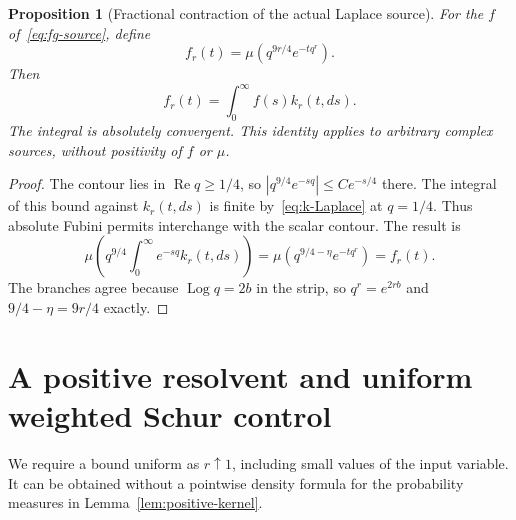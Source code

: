 \documentclass[11pt,a4paper]{article}
\numberwithin{equation}{section}
\newtheorem{proposition}[theorem]{Proposition}
\theoremstyle{definition}
\theoremstyle{remark}
\begin{document}
\begin{proposition}[Fractional contraction of the actual Laplace source]\label{prop:fractional-source}
For the $f$ of~\eqref{eq:fg-source}, define
\begin{equation}\label{eq:fr-definition}
 f_r(t)=\mu(q^{9r/4}e^{-tq^r}).
\end{equation}
Then
\begin{equation}\label{eq:fr-kernel}
 f_r(t)=\int_0^\infty f(s)k_r(t,ds).
\end{equation}
The integral is absolutely convergent. This identity applies to arbitrary complex sources, without positivity of $f$ or $\mu$.
\end{proposition}
\begin{proof}
The contour lies in $\operatorname{Re}q\ge1/4$, so
$|q^{9/4}e^{-sq}|\le C e^{-s/4}$ there. The integral of this bound against $k_r(t,ds)$ is finite by~\eqref{eq:k-Laplace} at $q=1/4$. Thus absolute Fubini permits interchange with the scalar contour. The result is
\[
 \mu\left(q^{9/4}\int_0^\infty e^{-sq}k_r(t,ds)\right)
 =\mu(q^{9/4-\eta}e^{-tq^r})=f_r(t).
\]
The branches agree because $\operatorname{Log}q=2b$ in the strip, so $q^r=e^{2rb}$ and $9/4-\eta=9r/4$ exactly.
\end{proof}

\section{A positive resolvent and uniform weighted Schur control}\label{sec:weighted-Schur}

We require a bound uniform as $r\uparrow1$, including small values of the input variable. It can be obtained without a pointwise density formula for the probability measures in Lemma~\ref{lem:positive-kernel}.
\end{document}
